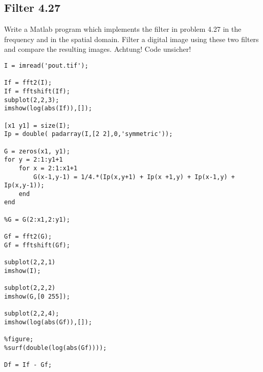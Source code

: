 \subsection{Filter 4.27}
Write a Matlab program which implements the filter in problem 4.27 in the
frequency and in the spatial domain. Filter a digital image using these two filters and compare the resulting images.
Achtung! Code unsicher!
\begin{lstlisting}
I = imread('pout.tif');

If = fft2(I);
If = fftshift(If);
subplot(2,2,3);
imshow(log(abs(If)),[]);

[x1 y1] = size(I);
Ip = double( padarray(I,[2 2],0,'symmetric'));

G = zeros(x1, y1);
for y = 2:1:y1+1
    for x = 2:1:x1+1
        G(x-1,y-1) = 1/4.*(Ip(x,y+1) + Ip(x +1,y) + Ip(x-1,y) + Ip(x,y-1));
    end
end

%G = G(2:x1,2:y1);

Gf = fft2(G);
Gf = fftshift(Gf);

subplot(2,2,1)
imshow(I);

subplot(2,2,2)
imshow(G,[0 255]);

subplot(2,2,4);
imshow(log(abs(Gf)),[]);

%figure;
%surf(double(log(abs(Gf))));

Df = If - Gf;
\end{lstlisting}

